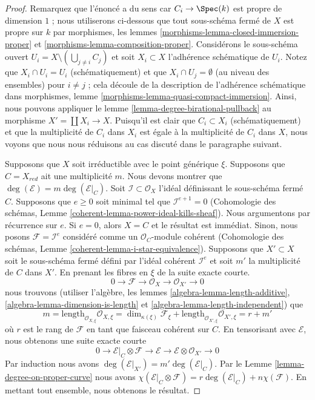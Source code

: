 \begin{proof}
Remarquez que l'énoncé a du sens car $C_i \to \Spec(k)$ est
propre de dimension $1$ ; nous utiliserons ci-dessous que tout
sous-schéma fermé de $X$ est propre sur $k$ par morphismes, les
lemmes \ref{morphisms-lemma-closed-immersion-proper} et
\ref{morphisms-lemma-composition-proper}. Considérons le
sous-schéma ouvert $U_i = X \setminus (\bigcup_{j \not = i} C_j)$
et soit $X_i \subset X$ l'adhérence schématique de $U_i$. Notez
que $X_i \cap U_i = U_i$ (schématiquement) et que $X_i \cap U_j =
\emptyset$ (au niveau des ensembles) pour $i \not = j$ ; cela
découle de la description de l'adhérence schématique dans
morphismes, lemme \ref{morphisms-lemma-quasi-compact-immersion}.
Ainsi, nous pouvons appliquer le lemme
\ref{lemma-degree-birational-pullback} au morphisme $X' = \coprod X_i \to
X$. Puisqu'il est clair que $C_i \subset X_i$ (schématiquement) et que la
multiplicité de $C_i$ dans $X_i$ est égale à la multiplicité de $C_i$ dans $X$,
nous voyons que nous nous réduisons au cas discuté dans le paragraphe suivant.

\medskip\noindent
Supposons que $X$ soit irréductible avec le point générique $\xi$.
Supposons que $C = X_{red}$ ait une multiplicité $m$. Nous devons
montrer que $\deg(\mathcal{E}) = m \deg(\mathcal{E}|_C)$. Soit
$\mathcal{I} \subset \mathcal{O}_X$ l'idéal définissant le sous-schéma
fermé $C$. Supposons que $e \geq 0$ soit minimal tel que
$\mathcal{I}^{e + 1} = 0$ (Cohomologie des schémas, Lemme
\ref{coherent-lemma-power-ideal-kills-sheaf}). Nous argumentons par
récurrence sur $e$. Si $e = 0$, alors $X = C$ et le résultat est immédiat.
Sinon, nous posons $\mathcal{F} = \mathcal{I}^e$ considéré comme un
$\mathcal{O}_C$-module cohérent (Cohomologie des schémas, Lemme
\ref{coherent-lemma-i-star-equivalence}). Supposons que $X' \subset X$ soit le
sous-schéma fermé défini par l'idéal cohérent $\mathcal{I}^e$ et soit $m'$ la
multiplicité de $C$ dans $X'$. En prenant les fibres en $\xi$ de la suite exacte courte.
$$
0 \to \mathcal{F} \to \mathcal{O}_X \to \mathcal{O}_{X'} \to 0
$$
nous trouvons (utiliser l'algèbre, les lemmes
\ref{algebra-lemma-length-additive},
\ref{algebra-lemma-dimension-is-length} et \ref{algebra-lemma-length-independent}) que
$$
m = \text{length}_{\mathcal{O}_{X, \xi}} \mathcal{O}_{X, \xi}
= \dim_{\kappa(\xi)} \mathcal{F}_\xi +
\text{length}_{\mathcal{O}_{X', \xi}} \mathcal{O}_{X', \xi}
= r + m'
$$
où $r$ est le rang de $\mathcal{F}$ en tant que faisceau cohérent sur $C$.
En tensorisant avec $\mathcal{E}$, nous obtenons une suite exacte courte
$$
0 \to \mathcal{E}|_C \otimes \mathcal{F} \to \mathcal{E} \to
\mathcal{E} \otimes \mathcal{O}_{X'} \to 0
$$
Par induction nous avons
$\deg(\mathcal{E}|_{X'}) = m'
\deg(\mathcal{E}|_C)$. Par le Lemme
\ref{lemma-degree-on-proper-curve} nous avons
$\chi(\mathcal{E}|_C \otimes \mathcal{F}) = r \deg(\mathcal{E}|_C) + n
\chi(\mathcal{F})$. En mettant tout ensemble, nous obtenons le résultat.
\end{proof}

